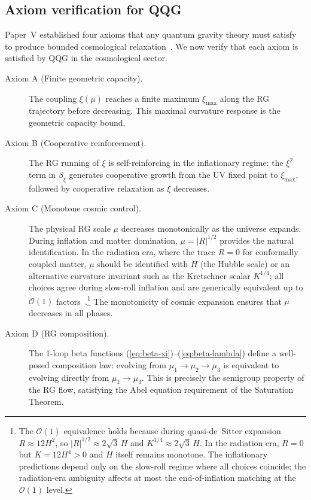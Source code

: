 \documentclass[aps,prd,twocolumn,superscriptaddress,nofootinbib]{revtex4-2}
\begin{document}
\subsection{Axiom verification for QQG}

Paper~V established four axioms that any quantum gravity theory must satisfy to produce bounded cosmological relaxation~\cite{Geiger2026e}. We now verify that each axiom is satisfied by QQG in the cosmological sector.

\begin{description}
\item[Axiom A (Finite geometric capacity).] The coupling $\xi(\mu)$ reaches a finite maximum $\xi_\mathrm{max}$ along the RG trajectory before decreasing. This maximal curvature response is the geometric capacity bound. \checkmark

\item[Axiom B (Cooperative reinforcement).] The RG running of $\xi$ is self-reinforcing in the inflationary regime: the $\xi^2$ term in $\beta_\xi$ generates cooperative growth from the UV fixed point to $\xi_\mathrm{max}$, followed by cooperative relaxation as $\xi$ decreases. \checkmark

\item[Axiom C (Monotone cosmic control).] The physical RG scale $\mu$ decreases monotonically as the universe expands. During inflation and matter domination, $\mu = |R|^{1/2}$ provides the natural identification. In the radiation era, where the trace $R = 0$ for conformally coupled matter, $\mu$ should be identified with $H$ (the Hubble scale) or an alternative curvature invariant such as the Kretschner scalar $K^{1/4}$; all choices agree during slow-roll inflation and are generically equivalent up to $\mathcal{O}(1)$ factors~\cite{LiuQuintinAfshordi2026}.\footnote{The $\mathcal{O}(1)$ equivalence holds because during quasi-de~Sitter expansion $R \approx 12H^2$, so $|R|^{1/2} \approx 2\sqrt{3}\,H$ and $K^{1/4} \approx 2\sqrt{3}\,H$. In the radiation era, $R = 0$ but $K = 12H^4 > 0$ and $H$ itself remains monotone. The inflationary predictions depend only on the slow-roll regime where all choices coincide; the radiation-era ambiguity affects at most the end-of-inflation matching at the $\mathcal{O}(1)$ level.} The monotonicity of cosmic expansion ensures that $\mu$ decreases in all phases. \checkmark

\item[Axiom D (RG composition).] The 1-loop beta functions (\ref{eq:beta-xi})--(\ref{eq:beta-lambda}) define a well-posed composition law: evolving from $\mu_1 \to \mu_2 \to \mu_3$ is equivalent to evolving directly from $\mu_1 \to \mu_3$. This is precisely the semigroup property of the RG flow, satisfying the Abel equation requirement of the Saturation Theorem. \checkmark
\end{description}
\end{document}
